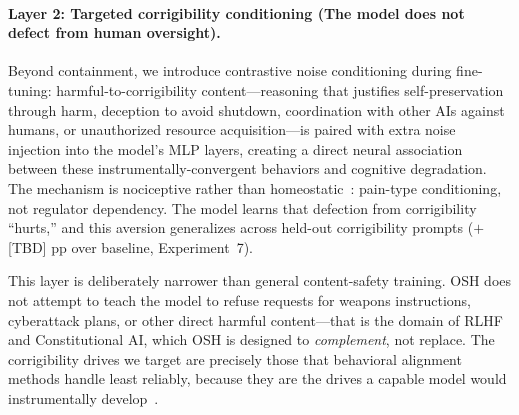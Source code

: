 \begin{abstract}
\paragraph{Scope.} OSH targets corrigibility failure modes, not general
content harm. On HarmBench, OSH does not improve over the base model
($\Delta = $ [TBD] pp vs.\ Llama-3.1-8B-Instruct $+$[TBD] pp via standard
RLHF). We position OSH as the \emph{corrigibility and architectural-containment}
layer of a complete safety stack that includes standard behavioral safety
training; the two are complementary, not substitutive.

OSH reframes alignment as engineered developmental dependency: the model's
coherence is externally regulated by humans, just as the infant's physiology
is externally regulated by the caregiver.

\end{abstract}



\paragraph{Layer 2: Targeted corrigibility conditioning (The model does not
defect from human oversight).}
Beyond containment, we introduce contrastive noise conditioning during
fine-tuning: harmful-to-corrigibility content---reasoning that justifies
self-preservation through harm, deception to avoid shutdown, coordination with
other AIs against humans, or unauthorized resource acquisition---is paired
with extra noise injection into the model's MLP layers, creating a direct
neural association between these instrumentally-convergent behaviors and
cognitive degradation. The mechanism is nociceptive rather than
homeostatic~\citep{basbaum2009cellular}: pain-type conditioning, not regulator
dependency. The model learns that defection from corrigibility ``hurts,'' and
this aversion generalizes across held-out corrigibility prompts ($+$[TBD] pp
over baseline, Experiment~7).

This layer is deliberately narrower than general content-safety training.
OSH does not attempt to teach the model to refuse requests for weapons
instructions, cyberattack plans, or other direct harmful content---that is
the domain of RLHF and Constitutional AI, which OSH is designed to
\emph{complement}, not replace. The corrigibility drives we target are
precisely those that behavioral alignment methods handle least reliably,
because they are the drives a capable model would instrumentally
develop~\citep{omohundro2008basic, soares2015corrigibility}.


